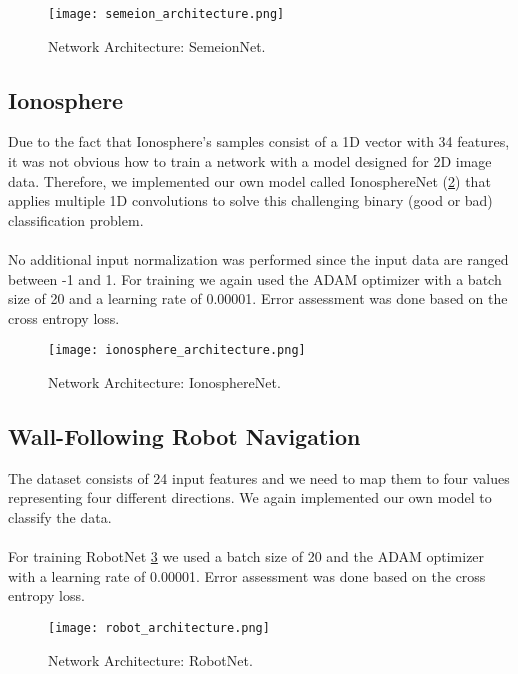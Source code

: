 \documentclass[a4paper, 11pt, twoside, openright]{article}
\begin{document}
\begin{figure}[h!]
	\centering
  \texttt{[image: semeion\_architecture.png]}
	\caption{Network Architecture: SemeionNet.}
	\label{semeion_architecture}
\end{figure}


\subsection{Ionosphere}

Due to the fact that Ionosphere's samples consist of a 1D vector with 34 features, it was not obvious how to train a network with a model designed for 2D image data. Therefore, we implemented our own model called IonosphereNet (\ref{ionosphere_architecture}) that applies multiple 1D convolutions to solve this challenging binary (good or bad) classification problem.
\\ \\
No additional input normalization was performed since the input data are ranged between -1 and 1. For training we again used the ADAM optimizer with a batch size of 20 and a learning rate of 0.00001. Error assessment was done based on the cross entropy loss.

\begin{figure}[h!]
	\centering
  \texttt{[image: ionosphere\_architecture.png]}
	\caption{Network Architecture: IonosphereNet.}
	\label{ionosphere_architecture}
\end{figure}

\subsection{Wall-Following Robot Navigation}

The dataset consists of 24 input features and we need to map them to four values representing four different directions.
We again implemented our own model to classify the data.
\\ \\
For training RobotNet \ref{robot_architecture} we used a batch size of 20 and the ADAM \cite{DBLP:journals/corr/KingmaB14} optimizer with a learning rate of 0.00001. Error assessment was done based on the cross entropy loss.

\begin{figure}[h!]
	\centering
  \texttt{[image: robot\_architecture.png]}
	\caption{Network Architecture: RobotNet.}
	\label{robot_architecture}
\end{figure}
\end{document}
